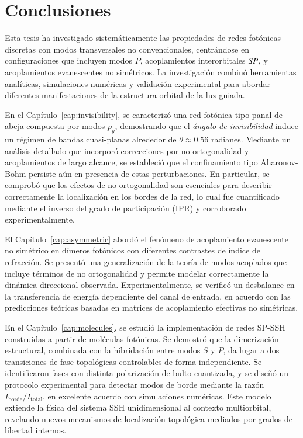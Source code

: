 \chapter{Conclusiones}
\label{cap:conclu}

Esta tesis ha investigado sistemáticamente las propiedades de redes fotónicas discretas con modos transversales no convencionales, centrándose en configuraciones que incluyen modos \( P \), acoplamientos interorbitales \( S\hspace*{-0.3ex}P \), y acoplamientos evanescentes no simétricos. La investigación combinó herramientas analíticas, simulaciones numéricas y validación experimental para abordar diferentes manifestaciones de la estructura orbital de la luz guiada.

En el Capítulo~\ref{cap:invisibility}, se caracterizó una red fotónica tipo panal de abeja compuesta por modos \( p_y \), demostrando que el \textit{ángulo de invisibilidad} induce un régimen de bandas cuasi-planas alrededor de \( \theta \approx 0.56 \) radianes. Mediante un análisis detallado que incorporó correcciones por no ortogonalidad y acoplamientos de largo alcance, se estableció que el confinamiento tipo Aharonov-Bohm persiste aún en presencia de estas perturbaciones. En particular, se comprobó que los efectos de no ortogonalidad son esenciales para describir correctamente la localización en los bordes de la red, lo cual fue cuantificado mediante el inverso del grado de participación (IPR) y corroborado experimentalmente.

El Capítulo~\ref{cap:asymmetric} abordó el fenómeno de acoplamiento evanescente no simétrico en dímeros fotónicos con diferentes contrastes de índice de refracción. Se presentó una generalización de la teoría de modos acoplados que incluye términos de no ortogonalidad y permite modelar correctamente la dinámica direccional observada. Experimentalmente, se verificó un desbalance en la transferencia de energía dependiente del canal de entrada, en acuerdo con las predicciones teóricas basadas en matrices de acoplamiento efectivas no simétricas.

En el Capítulo~\ref{cap:molecules}, se estudió la implementación de redes SP-SSH construidas a partir de moléculas fotónicas. Se demostró que la dimerización estructural, combinada con la hibridación entre modos \( S \) y \( P \), da lugar a dos transiciones de fase topológicas controlables de forma independiente. Se identificaron fases con distinta polarización de bulto cuantizada, y se diseñó un protocolo experimental para detectar modos de borde mediante la razón \( I_{\text{borde}} / I_{\text{total}} \), en excelente acuerdo con simulaciones numéricas. Este modelo extiende la física del sistema SSH unidimensional al contexto multiorbital, revelando nuevos mecanismos de localización topológica mediados por grados de libertad internos.

